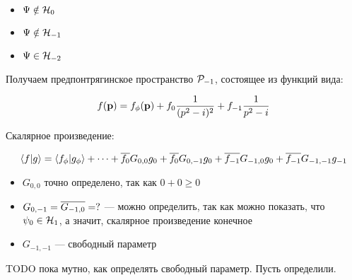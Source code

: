 \begin{itemize}
\item $\Psi \notin \mathcal{H}_{0}$ 
\item $\Psi \notin \mathcal{H}_{-1}$
\item $\Psi \in \mathcal{H}_{-2}$
\end{itemize}


Получаем предпонтрягинское пространство $\mathcal{P}_{-1}$, состоящее из функций вида:

\[
f(\vb{p}) = f_\phi(\vb{p}) + f_0 \frac{1}{(p^2 - i)^2} + f_{-1} \frac{1}{p^2 - i}
\]

Скалярное произведение:

\[
\ip{f}{g} = \ip{f_\phi}{g_\phi} + \dots + \cconj{f_0} G_{0,0} g_0 + \cconj{f_0} G_{0, -1} g_0 + \cconj{f_{-1}} G_{-1, 0} g_0 + \cconj{f_{-1}} G_{-1, -1} g_{-1}
\]

\begin{itemize}
\item $G_{0, 0}$ точно определено, так как $0 + 0 \ge 0$
\item $G_{0, -1} = \overline{G_{-1, 0}} = ?$ — можно определить, так как можно показать, что $\psi_0 \in \mathcal{H}_{1}$, а значит, скалярное произведение конечное
\item $G_{-1, -1}$ — свободный параметр
\end{itemize}

TODO пока мутно, как определять свободный параметр. Пусть определили.

